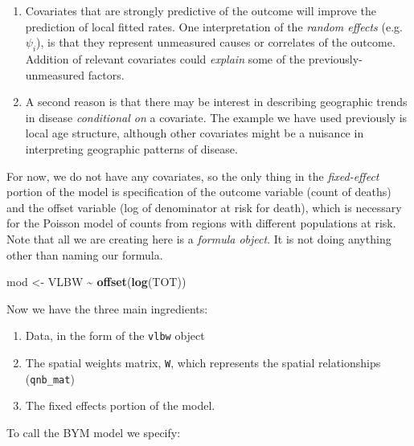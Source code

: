 \documentclass[
]{book}
\newenvironment{Shaded}{\begin{snugshade}}{\end{snugshade}}
\newcommand{\FunctionTok}[1]{\textcolor[rgb]{0.13,0.29,0.53}{\textbf{#1}}}
\newcommand{\NormalTok}[1]{#1}
\newcommand{\OtherTok}[1]{\textcolor[rgb]{0.56,0.35,0.01}{#1}}
\newcommand{\SpecialCharTok}[1]{\textcolor[rgb]{0.81,0.36,0.00}{\textbf{#1}}}
\providecommand{\tightlist}{%
  \setlength{\itemsep}{0pt}\setlength{\parskip}{0pt}}
\begin{document}
\begin{enumerate}
\def\labelenumi{\arabic{enumi}.}
\tightlist
\item
  Covariates that are strongly predictive of the outcome will improve the prediction of local fitted rates. One interpretation of the \emph{random effects} (e.g.~\(\psi_i\)), is that they represent unmeasured causes or correlates of the outcome. Addition of relevant covariates could \emph{explain} some of the previously-unmeasured factors.
\item
  A second reason is that there may be interest in describing geographic trends in disease \emph{conditional on} a covariate. The example we have used previously is local age structure, although other covariates might be a nuisance in interpreting geographic patterns of disease.
\end{enumerate}

For now, we do not have any covariates, so the only thing in the \emph{fixed-effect} portion of the model is specification of the outcome variable (count of deaths) and the offset variable (log of denominator at risk for death), which is necessary for the Poisson model of counts from regions with different populations at risk. Note that all we are creating here is a \emph{formula object}. It is not doing anything other than naming our formula.

\begin{Shaded}
\begin{Highlighting}[]
\NormalTok{mod }\OtherTok{\textless{}{-}}\NormalTok{ VLBW }\SpecialCharTok{\textasciitilde{}} \FunctionTok{offset}\NormalTok{(}\FunctionTok{log}\NormalTok{(TOT))}
\end{Highlighting}
\end{Shaded}

Now we have the three main ingredients:

\begin{enumerate}
\def\labelenumi{\arabic{enumi}.}
\tightlist
\item
  Data, in the form of the \texttt{vlbw} object
\item
  The spatial weights matrix, \texttt{W}, which represents the spatial relationships (\texttt{qnb\_mat})
\item
  The fixed effects portion of the model.
\end{enumerate}

To call the BYM model we specify:
\end{document}
